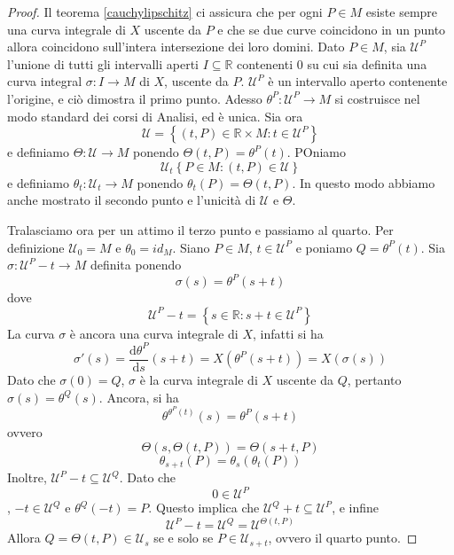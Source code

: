\documentclass[a4paper,11pt]{article}
\theoremstyle{definition}
\theoremstyle{theorem}
\begin{document}
\begin{proof}
	Il teorema \ref{cauchylipschitz} ci assicura che per ogni $P\in M$ esiste sempre una curva integrale di $X$ uscente da $P$ e che se due curve coincidono in un punto allora coincidono sull'intera intersezione dei loro domini. Dato $P\in M$, sia $\mathcal{U}^P$ l'unione di tutti gli intervalli aperti $I\subseteq \mathbb{R}$ contenenti 0 su cui sia definita una curva integral $\sigma\colon I\to M$ di $X$, uscente da $P$. $\mathcal{U}^P$ è un intervallo aperto contenente l'origine, e ciò dimostra il primo punto. Adesso $\theta^P\colon\mathcal{U}^P\to M$ si costruisce nel modo standard dei corsi di Analisi, ed è unica. Sia ora
	\[\mathcal{U}=\left\{(t,P)\in\mathbb{R}\times M:t\in\mathcal{U}^P\right\}\]
	e definiamo $\Theta\colon\mathcal{U}\to M$ ponendo $\Theta(t,P)=\theta^P(t)$. POniamo
	\[\mathcal{U}_t\left\{P\in M:(t,P)\in\mathcal{U}\right\}\]
	e definiamo $\theta_t\colon\mathcal{U}_t\to M$ ponendo $\theta_t(P)=\Theta(t,P)$. In questo modo abbiamo anche mostrato il secondo punto e l'unicità di $\mathcal{U}$ e $\Theta$. 
	
	Tralasciamo ora per un attimo il terzo punto e passiamo al quarto. Per definizione $\mathcal{U}_0=M$ e $\theta_0=id_M$. Siano $P\in M$, $t\in\mathcal{U}^P$ e poniamo $Q=\theta^P(t)$. Sia $\sigma\colon\mathcal{U}^P-t\to M$ definita ponendo \[\sigma(s)=\theta^P(s+t)\] dove
	\[\mathcal{U}^P-t=\left\{s\in\mathbb{R}:s+t\in\mathcal{U}^P\right\}\]
	La curva $\sigma$ è ancora una curva integrale di $X$, infatti si ha
	\[\sigma'(s)=\frac{\mathrm{d}\theta^P}{\mathrm{d}s}(s+t)=X\left(\theta^P(s+t)\right)=X(\sigma(s))\]
	Dato che $\sigma(0)=Q$, $\sigma$ è la curva integrale di $X$ uscente da $Q$, pertanto $\sigma(s)=\theta^Q(s)$. Ancora, si ha
	\[\theta^{\theta^P(t)}(s)=\theta^P(s+t)\]
	ovvero
	\[\Theta(s,\Theta(t,P))=\Theta(s+t,P)\]
	\[\theta_{s+t}(P)=\theta_{s}(\theta_t(P))\]
	Inoltre, $\mathcal{U}^P-t\subseteq\mathcal{U}^Q$. Dato che \[0\in\mathcal{U}^P\], $-t\in\mathcal{U}^Q$ e $\theta^Q(-t)=P$. Questo implica che $\mathcal{U}^Q+t\subseteq\mathcal{U}^P$, e infine \[\mathcal{U}^P-t=\mathcal{U}^Q=\mathcal{U}^{\Theta(t,P)}\]
	Allora $Q=\Theta(t,P)\in\mathcal{U}_s$ se e solo se $P\in\mathcal{U}_{s+t}$, ovvero il quarto punto.
	

\end{proof}
\end{document}
